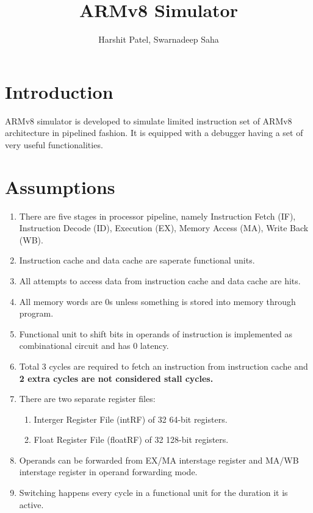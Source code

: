 \documentclass[12pt]{report}
\begin{document}
\title{ARMv8 Simulator}
\author{Harshit Patel, Swarnadeep Saha}
\maketitle

\section*{Introduction}
ARMv8 simulator is developed to simulate limited instruction set of ARMv8 architecture in pipelined fashion. It is equipped with a debugger having a set of very useful functionalities.

\section*{Assumptions}
\begin{enumerate}
\item{There are five stages in processor pipeline, namely Instruction Fetch (IF), Instruction Decode (ID), Execution (EX), Memory Access (MA), Write Back (WB).}
\item{Instruction cache and data cache are saperate functional units.}
\item{All attempts to access data from instruction cache and data cache are hits.}
\item{All memory words are 0s unless something is stored into memory through program.}
\item{Functional unit to shift bits in operands of instruction is implemented as combinational circuit and has 0 latency.}
\item{Total 3 cycles are required to fetch an instruction from instruction cache and \bf{2 extra cycles are not considered stall cycles}.}
\item{There are two separate register files:}
\begin{enumerate}
\item{Interger Register File (intRF) of 32 64-bit registers.}
\item{Float Register File (floatRF) of 32 128-bit registers.}
\end{enumerate}
\item{Operands can be forwarded from EX/MA interstage register and MA/WB interstage register in operand forwarding mode.}
\item{Switching happens every cycle in a functional unit for the duration it is active.}
\end{enumerate}
\end{document}

